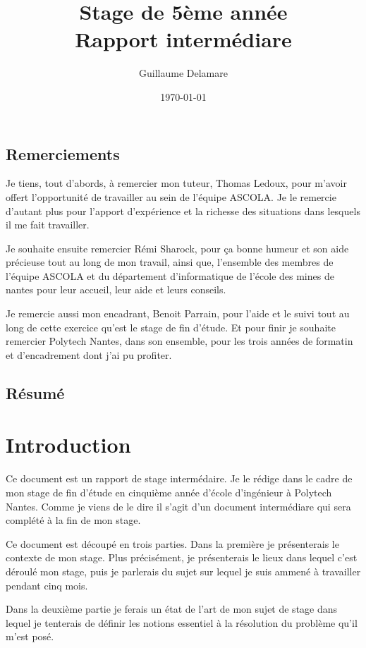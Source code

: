 \documentclass[a4paper, 11pt]{report}
\title{Stage de 5ème année\\ \large Rapport intermédiare}
\author{Guillaume Delamare}
\date{\today}
\begin{document}
\maketitle

\section*{Remerciements}
Je tiens, tout d'abords, à remercier mon tuteur, Thomas Ledoux, pour m'avoir offert l'opportunité de travailler au sein de l'équipe ASCOLA. Je le remercie d'autant plus pour l'apport d'expérience et la richesse des situations dans lesquels il me fait travailler.

Je souhaite ensuite remercier Rémi Sharock, pour ça bonne humeur et son aide précieuse tout au long de mon travail, ainsi que, l'ensemble des membres de l'équipe ASCOLA et du département d'informatique de l'école des mines de nantes pour leur accueil, leur aide et leurs conseils.

Je remercie aussi mon encadrant, Benoit Parrain, pour l'aide et le suivi tout au long de cette exercice qu'est le stage de fin d'étude. Et pour finir je souhaite remercier Polytech Nantes, dans son ensemble, pour les trois années de formatin et d'encadrement dont j'ai pu profiter.

\newpage

\section*{Résumé}

\newpage

\tableofcontents



\chapter{Introduction}
Ce document est un rapport de stage intermédaire. Je le rédige dans le cadre de mon stage de fin d'étude en cinquième année d'école d'ingénieur à Polytech Nantes. Comme je viens de le dire il s'agit d'un document intermédiare qui sera complété à la fin de mon stage. 

Ce document est découpé en trois parties. Dans la première je présenterais le contexte de mon stage. Plus précisément, je présenterais le lieux dans lequel c'est déroulé mon stage, puis je parlerais du sujet sur lequel je suis ammené à travailler pendant cinq mois.

Dans la deuxième partie je ferais un état de l'art de mon sujet de stage dans lequel je tenterais de définir les notions essentiel à la résolution du problème qu'il m'est posé.
\end{document}
